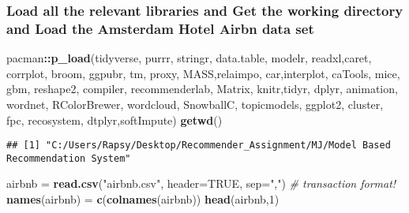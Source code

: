 \documentclass[]{article}
\newenvironment{Shaded}{\begin{snugshade}}{\end{snugshade}}
\newcommand{\CommentTok}[1]{\textcolor[rgb]{0.56,0.35,0.01}{\textit{#1}}}
\newcommand{\DataTypeTok}[1]{\textcolor[rgb]{0.13,0.29,0.53}{#1}}
\newcommand{\DecValTok}[1]{\textcolor[rgb]{0.00,0.00,0.81}{#1}}
\newcommand{\KeywordTok}[1]{\textcolor[rgb]{0.13,0.29,0.53}{\textbf{#1}}}
\newcommand{\NormalTok}[1]{#1}
\newcommand{\OperatorTok}[1]{\textcolor[rgb]{0.81,0.36,0.00}{\textbf{#1}}}
\newcommand{\OtherTok}[1]{\textcolor[rgb]{0.56,0.35,0.01}{#1}}
\newcommand{\StringTok}[1]{\textcolor[rgb]{0.31,0.60,0.02}{#1}}
\begin{document}
\hypertarget{load-all-the-relevant-libraries-and-get-the-working-directory-and-load-the-amsterdam-hotel-airbn-data-set}{%
\subsubsection{Load all the relevant libraries and Get the working
directory and Load the Amsterdam Hotel Airbn data
set}\label{load-all-the-relevant-libraries-and-get-the-working-directory-and-load-the-amsterdam-hotel-airbn-data-set}}

\begin{Shaded}
\begin{Highlighting}[]
\NormalTok{pacman}\OperatorTok{::}\KeywordTok{p_load}\NormalTok{(tidyverse, purrr, stringr, data.table, modelr, readxl,caret, corrplot, broom, ggpubr, tm, proxy, MASS,relaimpo, car,interplot, caTools, mice, gbm, reshape2, compiler, recommenderlab, Matrix, knitr,tidyr, dplyr, animation, wordnet, RColorBrewer, wordcloud, SnowballC, topicmodels, ggplot2, cluster, fpc, recosystem, dtplyr,softImpute)}
\KeywordTok{getwd}\NormalTok{()}
\end{Highlighting}
\end{Shaded}

\begin{verbatim}
## [1] "C:/Users/Rapsy/Desktop/Recommender_Assignment/MJ/Model Based Recommendation System"
\end{verbatim}

\begin{Shaded}
\begin{Highlighting}[]
\NormalTok{airbnb =}\StringTok{ }\KeywordTok{read.csv}\NormalTok{(}\StringTok{"airbnb.csv"}\NormalTok{, }\DataTypeTok{header=}\OtherTok{TRUE}\NormalTok{, }\DataTypeTok{sep=}\StringTok{","}\NormalTok{) }\CommentTok{# transaction format!}
\KeywordTok{names}\NormalTok{(airbnb) =}\StringTok{ }\KeywordTok{c}\NormalTok{(}\KeywordTok{colnames}\NormalTok{(airbnb))}
\KeywordTok{head}\NormalTok{(airbnb,}\DecValTok{1}\NormalTok{)}
\end{Highlighting}
\end{Shaded}
\end{document}
